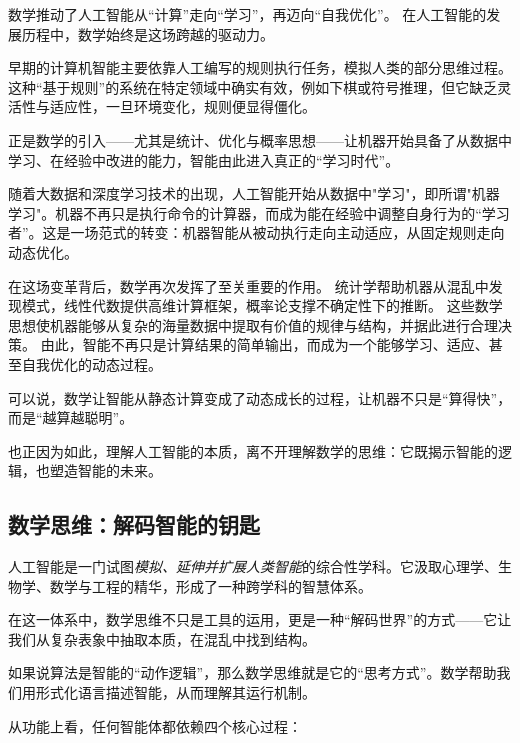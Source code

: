 数学推动了人工智能从“计算”走向“学习”，再迈向“自我优化”。
在人工智能的发展历程中，数学始终是这场跨越的驱动力。

早期的计算机智能主要依靠人工编写的规则执行任务，模拟人类的部分思维过程。
这种“基于规则”的系统在特定领域中确实有效，例如下棋或符号推理，但它缺乏灵活性与适应性，一旦环境变化，规则便显得僵化。

正是数学的引入——尤其是统计、优化与概率思想——让机器开始具备了从数据中学习、在经验中改进的能力，智能由此进入真正的“学习时代”。

随着大数据和深度学习技术的出现，人工智能开始从数据中"学习"，即所谓"机器学习"。机器不再只是执行命令的计算器，而成为能在经验中调整自身行为的“学习者”。这是一场范式的转变：机器智能从被动执行走向主动适应，从固定规则走向动态优化。

在这场变革背后，数学再次发挥了至关重要的作用。
统计学帮助机器从混乱中发现模式，线性代数提供高维计算框架，概率论支撑不确定性下的推断。
这些数学思想使机器能够从复杂的海量数据中提取有价值的规律与结构，并据此进行合理决策。
由此，智能不再只是计算结果的简单输出，而成为一个能够学习、适应、甚至自我优化的动态过程。

可以说，数学让智能从静态计算变成了动态成长的过程，让机器不只是“算得快”，而是“越算越聪明”。

也正因为如此，理解人工智能的本质，离不开理解数学的思维：它既揭示智能的逻辑，也塑造智能的未来。


\subsection{数学思维：解码智能的钥匙}
人工智能是一门试图\emph{模拟、延伸并扩展人类智能}的综合性学科。它汲取心理学、生物学、数学与工程的精华，形成了一种跨学科的智慧体系。

在这一体系中，数学思维不只是工具的运用，更是一种“解码世界”的方式——它让我们从复杂表象中抽取本质，在混乱中找到结构。

如果说算法是智能的“动作逻辑”，那么数学思维就是它的“思考方式”。数学帮助我们用形式化语言描述智能，从而理解其运行机制。

从功能上看，任何智能体都依赖四个核心过程：


